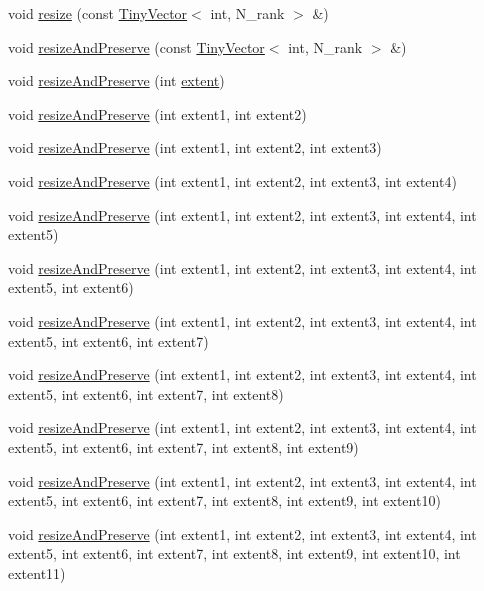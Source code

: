 \begin{DoxyCompactItemize}
\item 
void \hyperlink{classArray_a263735ac141c67cfb77fd27b8989504c}{resize} (const \hyperlink{classTinyVector}{Tiny\+Vector}$<$ int, N\+\_\+rank $>$ \&)
\item 
void \hyperlink{classArray_a2423ec5bd415b4445622af8f55df6c5e}{resize\+And\+Preserve} (const \hyperlink{classTinyVector}{Tiny\+Vector}$<$ int, N\+\_\+rank $>$ \&)
\item 
void \hyperlink{classArray_ade1025d35d5f90e0753b2810964d722e}{resize\+And\+Preserve} (int \hyperlink{classArray_a0e366d6568c6f976ea3657fea13794b7}{extent})
\item 
void \hyperlink{classArray_a3641a81c23bb5a3a329264093433f703}{resize\+And\+Preserve} (int extent1, int extent2)
\item 
void \hyperlink{classArray_aff1de2e7b62e66a7b8e935a91ab99de1}{resize\+And\+Preserve} (int extent1, int extent2, int extent3)
\item 
void \hyperlink{classArray_a463e37f0eda165111a461d2e6d71df28}{resize\+And\+Preserve} (int extent1, int extent2, int extent3, int extent4)
\item 
void \hyperlink{classArray_af53fad58b5426946fb0c247b61a9e130}{resize\+And\+Preserve} (int extent1, int extent2, int extent3, int extent4, int extent5)
\item 
void \hyperlink{classArray_a9590e881fb1a6ef74fa2979a863e275f}{resize\+And\+Preserve} (int extent1, int extent2, int extent3, int extent4, int extent5, int extent6)
\item 
void \hyperlink{classArray_af48202c44a9a834320f2544bb44392e6}{resize\+And\+Preserve} (int extent1, int extent2, int extent3, int extent4, int extent5, int extent6, int extent7)
\item 
void \hyperlink{classArray_a67f8b078e2e9c71002c00c554a3d0400}{resize\+And\+Preserve} (int extent1, int extent2, int extent3, int extent4, int extent5, int extent6, int extent7, int extent8)
\item 
void \hyperlink{classArray_a6f165a5193f1c123e90e82ddf29daa81}{resize\+And\+Preserve} (int extent1, int extent2, int extent3, int extent4, int extent5, int extent6, int extent7, int extent8, int extent9)
\item 
void \hyperlink{classArray_a488c1b7ef9e12c5e4dc10aabad310234}{resize\+And\+Preserve} (int extent1, int extent2, int extent3, int extent4, int extent5, int extent6, int extent7, int extent8, int extent9, int extent10)
\item 
void \hyperlink{classArray_a54b0c4651fbde1aa3c04a2be87abcbda}{resize\+And\+Preserve} (int extent1, int extent2, int extent3, int extent4, int extent5, int extent6, int extent7, int extent8, int extent9, int extent10, int extent11)

\end{DoxyCompactItemize}
